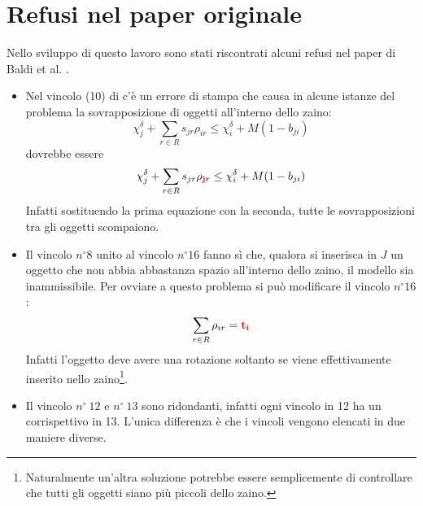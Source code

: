 \documentclass{scrartcl}
\begin{document}
\section{Refusi nel paper originale}
Nello sviluppo di questo lavoro sono stati riscontrati alcuni refusi nel paper di Baldi et al. \cite{Baldi20129802}.
\begin{itemize}
	\item Nel vincolo (10) di \cite{Baldi20129802} c'è un errore di stampa che causa in alcune istanze del problema
	la sovrapposizione di oggetti all'interno dello zaino:
	$$
	\chi_j^\delta + \sum_{r\in R} s_{jr}\rho_{ir} \leq \chi_i^\delta + M(1-b_{ji})
	$$
	dovrebbe essere 
	$$
	\chi_j^\delta + \sum_{r\in R} s_{jr}\rho_{\mathbf{\color{red}j}r} \leq \chi_i^\delta + M(1-b_{ji})
	$$
	Infatti sostituendo la prima equazione con la seconda, tutte le sovrapposizioni tra gli oggetti scompaiono.
	
	\item Il vincolo $n^\circ 8$ unito al vincolo $n^\circ 16$ fanno sì che, qualora si inserisca in $J$ un oggetto che non abbia abbastanza spazio all'interno dello zaino, il modello sia inammissibile. Per ovviare a questo problema si può modificare il vincolo $n^\circ 16$:
	$$
	\sum_{r \in R} \rho_{ir} = \color{red}\mathbf{t_i}
	$$
	Infatti l'oggetto deve avere una rotazione soltanto se viene effettivamente inserito nello zaino\footnote{ 
	Naturalmente un'altra soluzione potrebbe essere semplicemente di controllare che tutti gli oggetti siano più piccoli dello zaino.}. 
	\item Il vincolo $n^\circ\ 12$ e $n^\circ\ 13$ sono ridondanti, infatti ogni vincolo in 12 ha un corrispettivo in 13. L'unica differenza è che i vincoli vengono elencati in due maniere diverse. 
\end{itemize}




\end{document}
